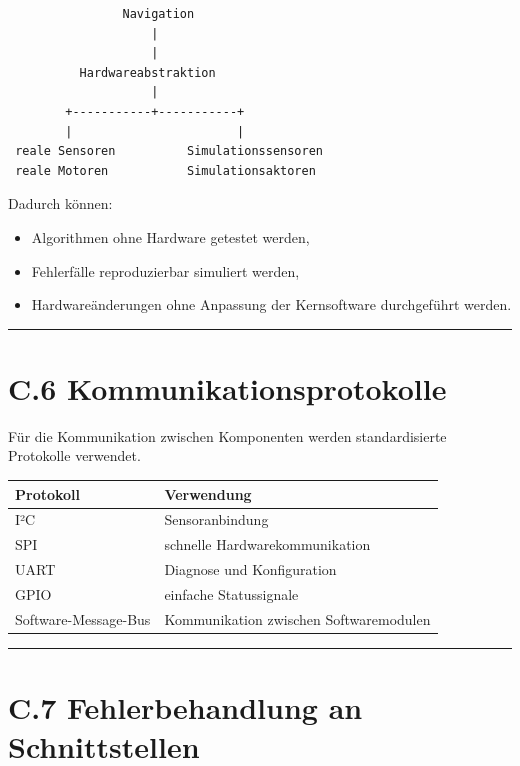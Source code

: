 \documentclass[
]{article}
\providecommand{\tightlist}{%
  \setlength{\itemsep}{0pt}\setlength{\parskip}{0pt}}
\begin{document}
\begin{verbatim}
                Navigation
                    |
                    |
          Hardwareabstraktion
                    |
        +-----------+-----------+
        |                       |
 reale Sensoren          Simulationssensoren
 reale Motoren           Simulationsaktoren
\end{verbatim}

Dadurch können:

\begin{itemize}
\tightlist
\item
  Algorithmen ohne Hardware getestet werden,
\item
  Fehlerfälle reproduzierbar simuliert werden,
\item
  Hardwareänderungen ohne Anpassung der Kernsoftware durchgeführt
  werden.
\end{itemize}

\begin{center}\rule{0.5\linewidth}{0.5pt}\end{center}

\section{C.6
Kommunikationsprotokolle}\label{c.6-kommunikationsprotokolle}

Für die Kommunikation zwischen Komponenten werden standardisierte
Protokolle verwendet.

\begin{longtable}[]{@{}ll@{}}
\toprule\noalign{}
Protokoll & Verwendung \\
\midrule\noalign{}
\endhead
\bottomrule\noalign{}
\endlastfoot
I²C & Sensoranbindung \\
SPI & schnelle Hardwarekommunikation \\
UART & Diagnose und Konfiguration \\
GPIO & einfache Statussignale \\
Software-Message-Bus & Kommunikation zwischen Softwaremodulen \\
\end{longtable}

\begin{center}\rule{0.5\linewidth}{0.5pt}\end{center}

\section{C.7 Fehlerbehandlung an
Schnittstellen}\label{c.7-fehlerbehandlung-an-schnittstellen}
\end{document}
